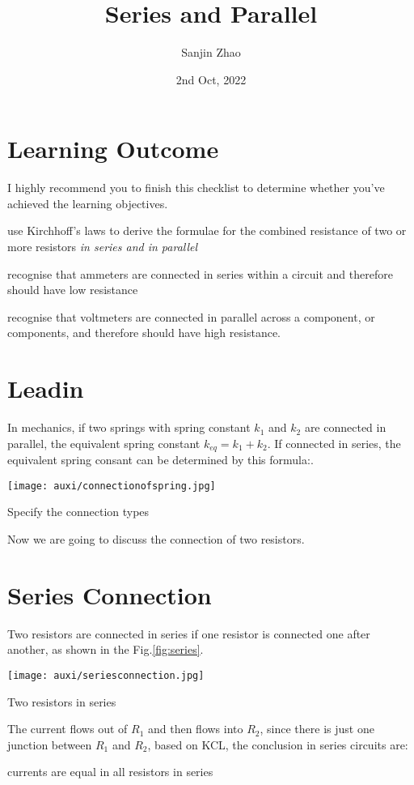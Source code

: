 \documentclass[a4paper]{tufte-handout}
\title{Series and Parallel}
\author{Sanjin Zhao}
\date{2nd Oct, 2022}  %
\begin{document}
\maketitle%
\section*{Learning Outcome}
I highly recommend you to finish this checklist to determine whether you've achieved the learning objectives.
\begin{todolist}
  \item use Kirchhoff’s laws to derive the formulae for the combined resistance of two or more resistors \emph{in series and in parallel}
  \item recognise that ammeters are connected in series within a circuit and therefore should have low resistance
  \item recognise that voltmeters are connected in parallel across a component, or components, and therefore should have high resistance.
\end{todolist}
\clearpage

\section{Leadin}
In mechanics, if two springs with spring constant $k_1$ and $k_2$ are connected in parallel, the equivalent spring constant $k_{eq}=k_1+k_2$. If connected in series, the equivalent spring consant can be determined by this formula:\uline{\hspace{1in}}.
\begin{marginfigure}
\texttt{[image: auxi/connectionofspring.jpg]}
\caption{Specify the connection types}
\end{marginfigure}
Now we are going to discuss the connection of two resistors.

\section{Series Connection}
Two resistors are connected in series if one resistor is connected one after another, as shown in the Fig.\ref{fig:series}. 
\begin{marginfigure}
\texttt{[image: auxi/seriesconnection.jpg]}
\caption{Two resistors in series}
\label{fig:series}
\end{marginfigure}
The current flows out of $R_1$ and then flows into $R_2$, since there is just one junction between $R_1$ and $R_2$, based on KCL, the conclusion in series circuits are:
\begin{center}
currents are equal in all resistors in series
\end{center}
\end{document}
